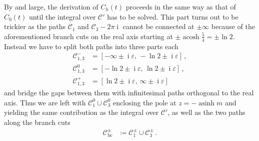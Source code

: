 \documentclass[a4paper]{article}
\DeclareMathOperator{\im}{i}
\DeclareMathOperator{\asinh}{asinh}
\DeclareMathOperator{\acosh}{acosh}
\begin{document}
	By and large, the derivation of $C_h(t)$ proceeds in the same way as that of $C_0(t)$ until the integral over $\mathcal C'$ has to be solved. This part turns out to be trickier as the paths $\mathcal C_1$ and $\mathcal C_3-2\pi\im$ cannot be connected at $\pm\infty$ because of the aforementioned branch cuts on the real axis starting at $\pm\acosh\frac54=\pm\ln2$. Instead we have to split both paths into three parts each
	\begin{align}
		\mathcal C_{1,3}^- &= \left[-\infty\pm\im\varepsilon,\,-\ln2\pm\im\varepsilon\right]\,,\\
		\mathcal C_{1,3}^0 &= \left[-\ln2\pm\im\varepsilon,\,\ln2\pm\im\varepsilon\right]\,,\\
		\mathcal C_{1,3}^+ &= \left[\ln2\pm\im\varepsilon,\,\infty\pm\im\varepsilon\right]
	\end{align}
	and bridge the gaps between them with infinitesimal paths orthogonal to the real axis. Thus we are left with $\mathcal C_1^0\cup\mathcal C_3^0$ enclosing the pole at $z=-\asinh m$ and yielding the same contribution as the integral over $\mathcal C'$, as well as the two paths along the branch cuts \begin{align}
		\mathcal C_\text{bc}^\pm &\coloneqq \mathcal C_1^\pm\cup\mathcal C_3^\pm\,.
	\end{align}
\end{document}

